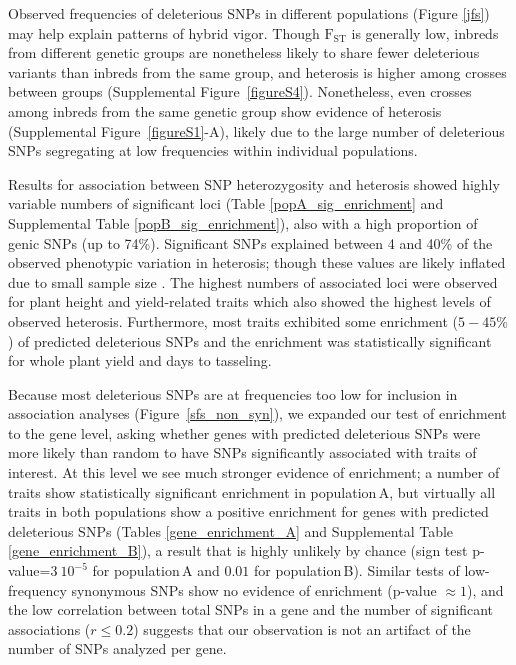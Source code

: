 \documentclass[12pt]{article}
\begin{document}
Observed frequencies of deleterious SNPs in different populations (Figure \ref{jfs}) may help explain patterns of hybrid vigor.  Though $\mathrm{F}_{\mathrm{ST}}$ is generally low, inbreds from different genetic groups are nonetheless likely to share fewer deleterious variants than inbreds from the same group, and heterosis is higher among crosses between groups (Supplemental Figure~\ref{figureS4}).  Nonetheless, even crosses among inbreds from the same genetic group show evidence of heterosis (Supplemental Figure~\ref{figureS1}-A), likely due to the large number of deleterious SNPs segregating at low frequencies within individual populations.   

Results for association between SNP heterozygosity and heterosis showed highly variable numbers of significant loci (Table \ref{popA_sig_enrichment} and Supplemental Table \ref{popB_sig_enrichment}), also with a high proportion of genic SNPs (up to 74\%). Significant SNPs explained between 4 and 40\% of the observed phenotypic variation in heterosis; though these values are likely inflated due to small sample size \citep{Beavis1994}. The highest numbers of associated loci were observed for plant height and yield-related traits which also showed the highest levels of observed heterosis. 
Furthermore, most traits exhibited some enrichment ($5-45\%$) of predicted deleterious SNPs and the enrichment was statistically significant for whole plant yield and days to tasseling.

Because most deleterious SNPs are at frequencies too low for inclusion in association analyses (Figure~\ref{sfs_non_syn}), we expanded our test of enrichment to the gene level, asking whether genes with predicted deleterious SNPs were more likely than random to have SNPs significantly associated with traits of interest. At this level we see much stronger evidence of enrichment; a number of traits show statistically significant enrichment in population\,A, but virtually all traits in both populations show a positive enrichment for genes with predicted deleterious SNPs (Tables \ref{gene_enrichment_A} and Supplemental Table \ref{gene_enrichment_B}), a result that is highly unlikely by chance (sign test p-value=$3\ 10^{-5}$ for population\,A and $0.01$ for population\,B). Similar tests of low-frequency synonymous SNPs show no evidence of enrichment (p-value $\approx 1$), and the low correlation between total SNPs in a gene and the number of significant associations ($r\leq 0.2$) suggests that our observation is not an artifact of the number of SNPs analyzed per gene. 
\end{document}
